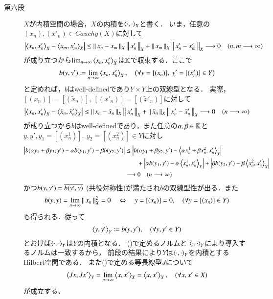 \begin{prf}
\begin{description}
			\item[第六段]
				$X$が内積空間の場合，$X$の内積を$\inprod<\cdot,\cdot>_X$と書く．
				いま，任意の$(x_n),(x'_n) \in Cauchy(X)$に対して
				\begin{align}
					\left| \inprod<x_n,x'_n>_X - \inprod<x_m,x'_m>_X \right|
					\leq \Norm{x_n - x_m}{X}\Norm{x'_n}{X} + \Norm{x_m}{X}\Norm{x'_n - x'_m}{X} 
					\longrightarrow 0
					\quad (n,m \longrightarrow \infty)
				\end{align}
				が成り立つから$\lim_{n \to \infty} \inprod<x_n,x'_n>_X$は$\mathbb{K}$で収束する．ここで
				\begin{align}
					b(y,y') \coloneqq \lim_{n \to \infty} \inprod<x_n, x'_n>_X,
					\quad \left( \forall y = [(x_n)],\ y' = [(x'_n)] \in Y \right)
				\end{align}
				と定めれば，$b$はwell-definedであり$Y \times Y$上の双線型となる．
				実際，$[(x_n)] = [(\tilde{x}_n)],\ [(x'_n)] = [(\tilde{x}'_n)]$に対して
				\begin{align}
					\left| \inprod<x_n,x'_n>_X - \inprod<\tilde{x}_n,\tilde{x}'_n>_X \right|
					\leq \Norm{x_n - \tilde{x}_n}{X}\Norm{x'_n}{X} 
						+ \Norm{\tilde{x}_n}{X}\Norm{x'_n - \tilde{x}'_n}{X} 
					\longrightarrow 0
					\quad (n \longrightarrow \infty)
				\end{align}
				が成り立つから$b$はwell-definedであり，また任意の$\alpha,\beta \in \mathbb{K}$と
				$y,y',y_1 = [(x^1_n)],\ y_2 = [(x^2_n)] \in Y$に対し
				\begin{align}
					\left| b(\alpha y_1 + \beta y_2,y') - \alpha b(y_1,y') - \beta b(y_2,y') \right|
					&\leq \left| b(\alpha y_1 + \beta y_2,y') - \inprod<\alpha x^1_n + \beta x^2_n,x'_n>_X \right| \\
					&\qquad+ \left| \alpha b(y_1,y') - \alpha \inprod<x^1_n,x'_n>_X \right|
					+ \left| \beta b(y_2,y') - \beta \inprod<x^2_n,x'_n>_X \right| \\
					&\longrightarrow 0 \quad (n \longrightarrow \infty)
				\end{align}
				かつ$b(y,y') = \overline{b(y',y)}$ (共役対称性)が満たされ$b$の双線型性が出る．また
				\begin{align}
					b(y,y) = \lim_{n \to \infty} \left\|\, x_n\, \right\|_{X}^2 = 0
					\quad \Leftrightarrow \quad y = [(x_n)] = 0,
					\quad (\forall y = [(x_n)] \in Y)
				\end{align}
				も得られる．従って
				\begin{align}
					\inprod<y,y'>_Y \coloneqq b(y,y'),
					\quad (\forall y,y' \in Y)
				\end{align}
				とおけば$\inprod<\cdot,\cdot>_Y$は$Y$の内積となる．
				()で定めるノルムと
				$\inprod<\cdot,\cdot>_Y$により導入するノルムは一致するから，
				前段の結果により$Y$は$\inprod<\cdot,\cdot>_Y$を内積とするHilbert空間である．
				また()で定める等長線型$J$について
				\begin{align}
					\inprod<Jx,Jx'>_Y = \lim_{n \to \infty} \inprod<x,x'>_X 
					= \inprod<x,x'>_X,
					\quad (\forall x,x' \in X)
				\end{align}
				が成立する．
				\QED
		\end{description}
	\end{prf}